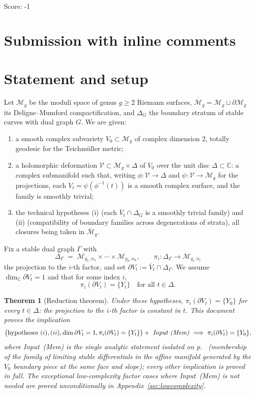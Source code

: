 \documentclass[11pt]{article}
\newcommand{\C}{\mathbb{C}}
\newcommand{\M}{\mathcal{M}}
\newtheorem{thm}{Theorem}[section]
\theoremstyle{definition}
\theoremstyle{remark}
\begin{document}
\noindent Score: -1

\newpage
\section{Submission with inline comments}


\section{Statement and setup}

Let $\M_g$ be the moduli space of genus $g \ge 2$ Riemann surfaces,
$\overline{\M}_g = \M_g \sqcup \partial \M_g$ its Deligne--Mumford
compactification, and $\Delta_G$ the boundary stratum of stable curves with
dual graph $G$. We are given:
\begin{enumerate}[label=(\Roman*)]
\item a smooth complex subvariety $V_0 \subset \M_g$ of complex dimension $2$,
totally geodesic for the Teichm\"uller metric;
\item a holomorphic deformation $\mathcal{V} \subset \M_g \times \Delta$ of
$V_0$ over the unit disc $\Delta \subset \C$: a complex submanifold such
that, writing $\phi : \mathcal{V} \to \Delta$ and $\psi : \mathcal{V} \to
\M_g$ for the projections, each $V_t = \psi(\phi^{-1}(t))$ is a smooth
complex surface, and the family is smoothly trivial;
\item the technical hypotheses (i) (each $\overline{V}_t \cap \Delta_G$ is a
smoothly trivial family) and (ii) (compatibility of boundary families across
degenerations of strata), all closures being taken in $\overline{\M}_g$.
\end{enumerate}
Fix a stable dual graph $\Gamma$ with
\[
\Delta_\Gamma \;=\; \M_{g_1,n_1} \times \cdots \times \M_{g_k,n_k},
\qquad \pi_i : \Delta_\Gamma \longrightarrow \M_{g_i,n_i}
\]
the projection to the $i$-th factor, and set
$\partial V_t := \overline{V}_t \cap \Delta_\Gamma$. We assume
$\dim_{\C} \partial V_t = 1$ and that for some index $i$,
\[
\pi_i(\partial V_t) = \{Y_t\} \quad \text{for all } t \in \Delta .
\]

\begin{thm}[Reduction theorem]\label{thm:main}
Under these hypotheses, $\pi_i(\partial V_t) = \{Y_0\}$ for every
$t \in \Delta$: the projection to the $i$-th factor is constant in
$t$. \emph{This document proves the implication}
\[
\bigl(\text{hypotheses } (i), (ii), \dim\partial V_t = 1,
\pi_i(\partial V_t) = \{Y_t\}\bigr)
+\ \emph{Input~(Mem)}
\ \Longrightarrow\ \pi_i(\partial V_t) = \{Y_0\} ,
\]
where \emph{Input~(Mem)} is the single analytic statement isolated on
p.\ \pageref{input:membership} (membership of the family of limiting
stable differentials in the affine manifold generated by the $V_0$
boundary piece at the same face and slope); every other implication is
proved in full. The exceptional low-complexity factor cases where
Input~(Mem) is not needed are proved unconditionally in
Appendix~\ref{sec:lowcomplexity}.
\end{thm}
\end{document}

